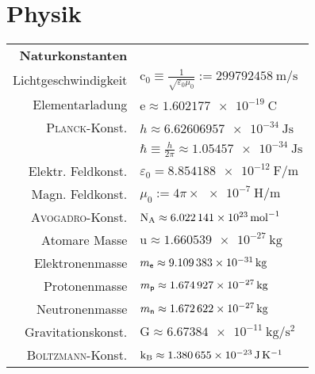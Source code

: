 \documentclass[english]{latex4ei/latex4ei_sheet}
\begin{document}
\section{Physik}


\begin{symbolbox}
	\renewcommand{\arraystretch}{1.5}
	\begin{tabular}{rl}
		\textbf{Naturkonstanten} & \\ \mrule
		Lichtgeschwindigkeit & $\mathrm{c}_0 \equiv \frac{1}{\sqrt{\varepsilon_0 \mu_0}} := \SI{299 792 458}{\meter\per\second}$\\
		Elementarladung & $\mathrm{e}  \approx \SI{1.602 177e-19}{\coulomb}$\\
		\textsc{Planck}-Konst. & $h \approx \SI{6,626 069 57e-34}{\joule\second}$\\
			& $\hbar \equiv \frac{h}{2 \pi} \approx \SI{1.05457e-34}{\joule\second}$ \\
		Elektr. Feldkonst. & $\varepsilon_0 = \SI{8.854 188e-12}{\farad\per\meter}$\\		%
		Magn. Feldkonst. & $\mu_0 := 4\pi \times \SI{e-7}{\henry\per\meter}$\\
		\textsc{Avogadro}-Konst. & $\mathrm{N}_{\text{A}} \approx \SI{6.022 141e23}{\per\mole}$\\
		Atomare Masse & $\mathrm{u} \approx \SI{1.660 539e-27}{\kilogram}$\\
		Elektronenmasse & $m_{\sf e} \approx \SI{9,109 383e-31}{\kilogram}$\\
		Protonenmasse & $m_{\sf p} \approx \SI{1,674 927e-27}{\kilogram}$\\
		Neutronenmasse & $m_{\sf n} \approx \SI{1,672 622e-27}{\kilogram}$\\
		Gravitationskonst. & $\mathrm{G} \approx \SI{6,673 84e-11}{\kilogram\per\second\squared}$\\
		\textsc{Boltzmann}-Konst. & $\mathrm{k}_{\text{B}} \approx \SI{1.380 655e-23}{\joule\per\kelvin}$\\
	\end{tabular}
\end{symbolbox}
\end{document}

